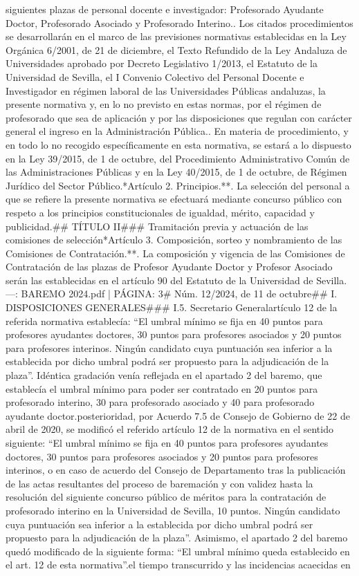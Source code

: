 \documentclass{article}
\begin{document}
\begin{itemize}
{{siguientes plazas de personal docente e investigador: Profesorado Ayudante Doctor, Profesorado Asociado y Profesorado Interino.. Los citados procedimientos se desarrollarán en el marco de las previsiones normativas establecidas en la Ley Orgánica 6/2001, de 21 de diciembre, el Texto Refundido de la Ley Andaluza de Universidades aprobado por Decreto Legislativo 1/2013, el Estatuto de la Universidad de Sevilla, el I Convenio Colectivo del Personal Docente e Investigador en régimen laboral de las Universidades Públicas andaluzas, la presente normativa y, en lo no previsto en estas normas, por el régimen de profesorado que sea de aplicación y por las disposiciones que regulan con carácter general el ingreso en la Administración Pública.. En materia de procedimiento, y en todo lo no recogido específicamente en esta normativa, se estará a lo dispuesto en la Ley 39/2015, de 1 de octubre, del Procedimiento Administrativo Común de las Administraciones Públicas y en la Ley 40/2015, de 1 de octubre, de Régimen Jurídico del Sector Público.\n\n**Artículo 2. Principios.**\n{}. La selección del personal a que se refiere la presente normativa se efectuará mediante concurso público con respeto a los principios constitucionales de igualdad, mérito, capacidad y publicidad.\n\n## TÍTULO II\n\n### Tramitación previa y actuación de las comisiones de selección\n\n**Artículo 3. Composición, sorteo y nombramiento de las Comisiones de Contratación.**\n{}. La composición y vigencia de las Comisiones de Contratación de las plazas de Profesor Ayudante Doctor y Profesor Asociado serán las establecidas en el artículo 90 del Estatuto de la Universidad de Sevilla.\n\n---\n\nFUENTE: BAREMO 2024.pdf | PÁGINA: 3\n# Núm. 12/2024, de 11 de octubre\n\n## I. DISPOSICIONES GENERALES\n\n### I.5. Secretario General\n\nEl artículo 12 de la referida normativa establecía: “El umbral mínimo se fija en 40 puntos para profesores ayudantes doctores, 30 puntos para profesores asociados y 20 puntos para profesores interinos. Ningún candidato cuya puntuación sea inferior a la establecida por dicho umbral podrá ser propuesto para la adjudicación de la plaza”. Idéntica gradación venía reflejada en el apartado 2 del baremo, que establecía el umbral mínimo para poder ser contratado en 20 puntos para profesorado interino, 30 para profesorado asociado y 40 para profesorado ayudante doctor.\n\nCon posterioridad, por Acuerdo 7.5 de Consejo de Gobierno de 22 de abril de 2020, se modificó el referido artículo 12 de la normativa en el sentido siguiente: “El umbral mínimo se fija en 40 puntos para profesores ayudantes doctores, 30 puntos para profesores asociados y 20 puntos para profesores interinos, o en caso de acuerdo del Consejo de Departamento tras la publicación de las actas resultantes del proceso de baremación y con validez hasta la resolución del siguiente concurso público de méritos para la contratación de profesorado interino en la Universidad de Sevilla, 10 puntos. Ningún candidato cuya puntuación sea inferior a la establecida por dicho umbral podrá ser propuesto para la adjudicación de la plaza”. Asimismo, el apartado 2 del baremo quedó modificado de la siguiente forma: “El umbral mínimo queda establecido en el art. 12 de esta normativa”.\n\nDado el tiempo transcurrido y las incidencias acaecidas en }}
\end{itemize}
\end{document}
